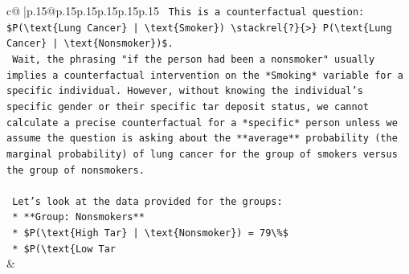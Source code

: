 \documentclass{article}
\begin{document}
{\begin{supertabular}{c@{$\;$}|p{.15\linewidth}@{}p{.15\linewidth}p{.15\linewidth}p{.15\linewidth}p{.15\linewidth}p{.15\linewidth}}
{{{\texttt{    This is a counterfactual question: \$P(\textbackslash{}text\{Lung Cancer\} | \textbackslash{}text\{Smoker\}) \textbackslash{}stackrel\{?\}\{>\} P(\textbackslash{}text\{Lung Cancer\} | \textbackslash{}text\{Nonsmoker\})\$.} \\
\texttt{    Wait, the phrasing "if the person had been a nonsmoker" usually implies a counterfactual intervention on the *Smoking* variable for a specific individual. However, without knowing the individual's specific gender or their specific tar deposit status, we cannot calculate a precise counterfactual for a *specific* person unless we assume the question is asking about the **average** probability (the marginal probability) of lung cancer for the group of smokers versus the group of nonsmokers.} \\
\\ 
\texttt{    Let's look at the data provided for the groups:} \\
\texttt{    *   **Group: Nonsmokers**} \\
\texttt{        *   \$P(\textbackslash{}text\{High Tar\} | \textbackslash{}text\{Nonsmoker\}) = 79\textbackslash{}\%\$} \\
\texttt{        *   \$P(\textbackslash{}text\{Low Tar} \\
            }
        }
    }
    & \\ \\


\end{supertabular}}
\end{document}
